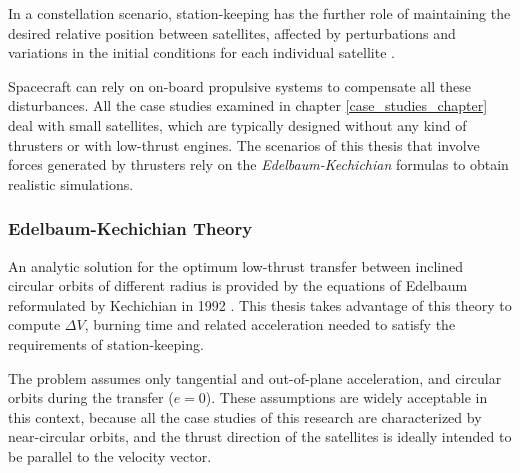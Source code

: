 In a constellation scenario, station-keeping has the further role of maintaining the desired relative position between satellites, affected by perturbations and variations in the initial conditions for each individual satellite \cite{wertz2009orbit}.

Spacecraft can rely on on-board propulsive systems to compensate all these disturbances.
All the case studies examined in chapter \ref{case_studies_chapter} deal with small satellites, which are typically designed without any kind of thrusters or with low-thrust engines.  
The scenarios of this thesis that involve forces generated by thrusters rely on the \textit{Edelbaum-Kechichian} formulas to obtain realistic simulations.


\subsubsection{Edelbaum-Kechichian Theory}
An analytic solution for the optimum low-thrust transfer between inclined circular orbits of different radius is provided by the equations of Edelbaum reformulated by Kechichian in 1992 \cite{edelbaum1961propulsion, kechichian1992reformulation}.
This thesis takes advantage of this theory to compute $\Delta V$, burning time and related acceleration needed to satisfy the requirements of station-keeping.

The problem assumes only tangential and out-of-plane acceleration, and circular orbits during the transfer ($e = 0$).
These assumptions are widely acceptable in this context, because all the case studies of this research are characterized by near-circular orbits, and the thrust direction of the satellites is ideally intended to be parallel to the velocity vector.

